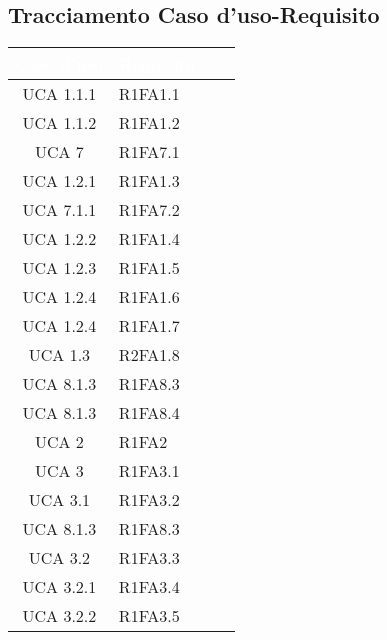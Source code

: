 \subsection{Tracciamento Caso d'uso-Requisito}
{
\renewcommand{\arraystretch}{1.5}
\centering
\begin{longtable}{ c C{4cm} c c}
\textcolor{white}{\textbf{Caso d'uso}} & \textcolor{white}{\textbf{Requisito}}\\	
\endhead


UCA 1.1.1 & R1FA1.1\\

UCA 1.1.2 & R1FA1.2\\

UCA 7 & R1FA7.1\\

UCA 1.2.1 & R1FA1.3\\

UCA 7.1.1 & R1FA7.2\\

UCA 1.2.2 & R1FA1.4\\

UCA 1.2.3 & R1FA1.5\\

UCA 1.2.4 & R1FA1.6\\

UCA 1.2.4 & R1FA1.7\\


UCA 1.3 & R2FA1.8\\

UCA 8.1.3 & R1FA8.3\\

UCA 8.1.3 & R1FA8.4\\

UCA 2 & R1FA2\\

UCA 3 & R1FA3.1\\

UCA 3.1 & R1FA3.2\\

UCA 8.1.3 & R1FA8.3\\

UCA 3.2 & R1FA3.3\\

UCA 3.2.1 & R1FA3.4\\


UCA 3.2.2 & R1FA3.5\\


\end{longtable}}
